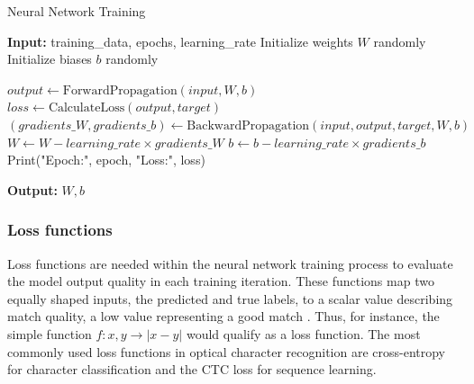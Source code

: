 \documentclass{article}
\begin{document}
\begin{algorithm}
    \caption{Neural Network Training}
    \begin{algorithmic}[1]
        \State \textbf{Input:} training\_data, epochs, learning\_rate
        \State Initialize weights $W$ randomly
        \State Initialize biases $b$ randomly
        
                \State $output \gets \text{ForwardPropagation}(input, W, b)$
                \State $loss \gets \text{CalculateLoss}(output, target)$
                \State $(gradients\_W, gradients\_b) \gets \text{BackwardPropagation}(input, output, target, W, b)$
                \State $W \gets W - learning\_rate \times gradients\_W$
                \State $b \gets b - learning\_rate \times gradients\_b$
            \EndFor
            \State Print("Epoch:", epoch, "Loss:", loss)
        \EndFor
        
        \State \textbf{Output:} $W, b$  
    \end{algorithmic}
    \label{alg:net_training}
\end{algorithm}

\subsubsection{Loss functions}
\label{sect:loss_funcs}

Loss functions are needed within the neural network training process to evaluate the model output 
quality in each training iteration. These functions map two equally shaped inputs, the predicted 
and true labels, to a scalar value describing match quality, a low value representing a good match \cite{princebook}. 
Thus, for instance, the simple function $f: x,y \rightarrow |x-y|$  would qualify as a loss function.
The most commonly used loss functions in optical character recognition are cross-entropy for 
character classification and the CTC loss for sequence learning.
\end{document}
